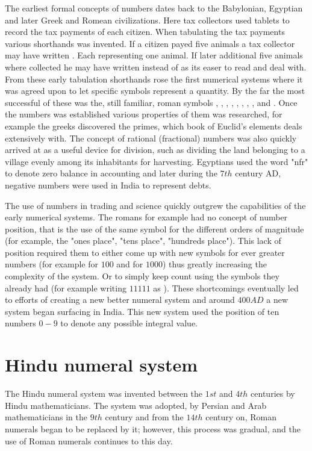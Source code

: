 \myindent The earliest formal concepts of numbers dates back to the Babylonian, Egyptian and later Greek and Romean civilizations. Here tax collectors used tablets to record the tax payments of each citizen. When tabulating the tax payments various shorthands was invented. If a citizen payed five animals a tax collector may have written . Each  representing one animal. If later additional five animals where collected he may have written  instead of  as its easer to read and deal with. From these early tabulation shorthands rose the first numerical systems where it was agreed upon to let specific symbols represent a quantity. By the far the most successful of these was the, still familiar, roman symbols , , , , , , , ,  and . Once the numbers was established various properties of them was researched, for example the greeks discovered the primes, which book  of Euclid's elements deals extensively with. The concept of rational (fractional) numbers was also quickly arrived at as a useful device for division, such as dividing the land belonging to a village evenly among its inhabitants for harvesting. Egyptians used the word "nfr" to denote zero balance in accounting and later during the $7th$ century AD, negative numbers were used in India to represent debts.

\myindent The use of numbers in trading and science quickly outgrew the capabilities of the early numerical systems. The romans for example had no concept of number position, that is the use of the same symbol for the different orders of magnitude (for example, the "ones place", "tens place", "hundreds place"). This lack of position required them to either come up with new symbols for ever greater numbers (for example  for $100$ and  for $1000$) thus greatly increasing the complexity of the system. Or to simply keep count using the symbols they already had (for example writing $11111$ as ). These shortcomings eventually led to efforts of creating a new better numeral system and around $400 AD$ a new system began surfacing in India. This new system used the position of ten numbers $0-9$ to denote any possible integral value.

\section{Hindu numeral system}
The Hindu numeral system was invented between the $1st$ and $4th$ centuries by Hindu mathematicians. The system was adopted, by Persian and Arab mathematicians in the $9th$ century and from the $14th$ century on, Roman numerals began to be replaced by it; however, this process was gradual, and the use of Roman numerals continues to this day.

